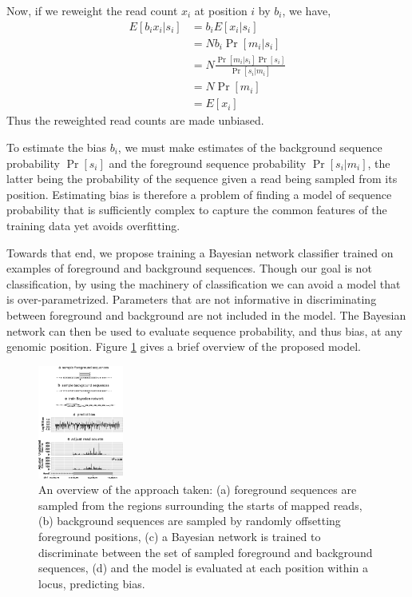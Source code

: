 \documentclass{bioinfo}
\begin{document}
Now, if we reweight the read count $x_i$ at position $i$ by $b_i$, we
have,
\begin{align*}
E[ b_i x_i | s_i ] &= b_i E[ x_i | s_i ] \\
&= N b_i \Pr[ m_i | s_i ] \\
&= N \frac{ \Pr[ m_i | s_i ] \Pr[ s_i ] }{ \Pr[ s_i | m_i ] } \\
&= N \Pr[ m_i ] \\
&= E[ x_i ]
\end{align*}
Thus the reweighted read counts are made unbiased.

To estimate the bias $b_i$, we must make estimates of the background sequence
probability $\Pr[s_i]$ and the foreground sequence probability $\Pr[ s_i | m_i
]$, the latter being the probability of the sequence given a read being sampled
from its position. Estimating bias is therefore a problem of finding a model of
sequence probability that is sufficiently complex to capture the common features
of the training data yet avoids overfitting.

Towards that end, we propose training a Bayesian network classifier trained on
examples of foreground and background sequences. Though our goal is not
classification, by using the machinery of classification we can avoid a model
that is over-parametrized. Parameters that are not informative in
discriminating between foreground and background are not included in the model.
The Bayesian network can then be used to evaluate sequence probability, and thus
bias, at any genomic position. Figure \ref{fig:overview} gives a brief overview
of the proposed model.

\begin{figure}
\centerline{\includegraphics[width=0.25\textwidth]{overview.eps}}
\caption{An overview of the approach taken: (a) foreground sequences are sampled
from the regions surrounding the starts of mapped reads, (b) background
sequences are sampled by randomly offsetting foreground positions, (c) a
Bayesian network is trained to discriminate between the set of
sampled foreground and background sequences, (d) and the model is evaluated
at each position within a locus, predicting bias.}
\label{fig:overview}
\end{figure}
\end{document}

